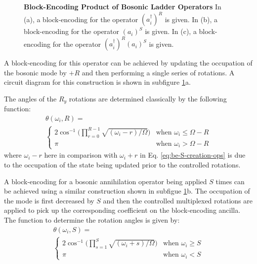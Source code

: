 \begin{figure}
    
    
    
    \caption{
        \textbf{Block-Encoding Product of Bosonic Ladder Operators}
        In (a), a block-encoding for the operator $(a_i^\dagger)^R$ is given.
        In (b), a block-encoding for the operator $(a_i)^S$ is given.
        In (c), a block-encoding for the operator $(a_i^\dagger)^R (a_i)^S$ is given.
    }
    \label{fig:products-bosonic-operators}
\end{figure}

A block-encoding for this operator can be achieved by updating the occupation of the bosonic mode by $+R$ and then performing a single series of rotations.
A circuit diagram for this construction is shown in subfigure \ref{fig:products-bosonic-operators}a.

The angles of the $R_y$ rotations are determined classically by the following function:
\begin{equation}
    \begin{split}
        \theta(\omega_i, R) = \\
        \begin{cases} 
            2\cos^{-1}\Big(\prod_{r=0}^{R-1}\sqrt{(\omega_i - r) / \Omega}\Big) & \text{when } \omega_i \leq \Omega - R \\
            \pi & \text{when } \omega_i > \Omega - R
        \end{cases}
    \end{split}
\end{equation}
where $\omega_i - r$ here in comparison with $\omega_i + r$ in Eq. \ref{eq:be-S-creation-ops} is due to the occupation of the state being updated prior to the controlled rotations.

A block-encoding for a bosonic annihilation operator being applied $S$ times can be achieved using a similar construction shown in subfigue \ref{fig:products-bosonic-operators}b.
The occupation of the mode is first decreased by $S$ and then the controlled multiplexed rotations are applied to pick up the corresponding coefficient on the block-encoding ancilla.
The function to determine the rotation angles is given by:
\begin{equation}
    \begin{split}
        \theta(\omega_i, S) = \\
        \begin{cases} 
            2\cos^{-1}\Big(\prod_{s=1}^{S}\sqrt{(\omega_i + s) / \Omega}\Big) & \text{when } \omega_i \geq S \\
            \pi & \text{when } \omega_i < S
        \end{cases}
    \end{split}
\end{equation}

